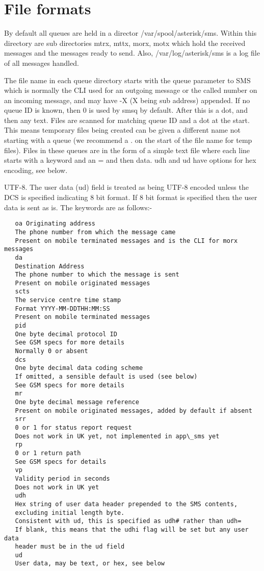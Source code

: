 \section{File formats}

   By default all queues are held in a director /var/spool/asterisk/sms.
   Within this directory are sub directories mtrx, mttx, morx, motx which
   hold the received messages and the messages ready to send. Also,
   /var/log/asterisk/sms is a log file of all messages handled.

   The file name in each queue directory starts with the queue parameter
   to SMS which is normally the CLI used for an outgoing message or the
   called number on an incoming message, and may have -X (X being sub
   address) appended. If no queue ID is known, then 0 is used by smsq by
   default. After this is a dot, and then any text. Files are scanned for
   matching queue ID and a dot at the start. This means temporary files
   being created can be given a different name not starting with a queue
   (we recommend a . on the start of the file name for temp files).
   Files in these queues are in the form of a simple text file where each
   line starts with a keyword and an = and then data. udh and ud have
   options for hex encoding, see below.

   UTF-8. The user data (ud) field is treated as being UTF-8 encoded
   unless the DCS is specified indicating 8 bit format. If 8 bit format
   is specified then the user data is sent as is.
   The keywords are as follows:-
\begin{verbatim}
   oa Originating address
   The phone number from which the message came
   Present on mobile terminated messages and is the CLI for morx messages
   da
   Destination Address
   The phone number to which the message is sent
   Present on mobile originated messages
   scts
   The service centre time stamp
   Format YYYY-MM-DDTHH:MM:SS
   Present on mobile terminated messages
   pid
   One byte decimal protocol ID
   See GSM specs for more details
   Normally 0 or absent
   dcs
   One byte decimal data coding scheme
   If omitted, a sensible default is used (see below)
   See GSM specs for more details
   mr
   One byte decimal message reference
   Present on mobile originated messages, added by default if absent
   srr
   0 or 1 for status report request
   Does not work in UK yet, not implemented in app\_sms yet
   rp
   0 or 1 return path
   See GSM specs for details
   vp
   Validity period in seconds
   Does not work in UK yet
   udh
   Hex string of user data header prepended to the SMS contents,
   excluding initial length byte.
   Consistent with ud, this is specified as udh# rather than udh=
   If blank, this means that the udhi flag will be set but any user data
   header must be in the ud field
   ud
   User data, may be text, or hex, see below
\end{verbatim}


